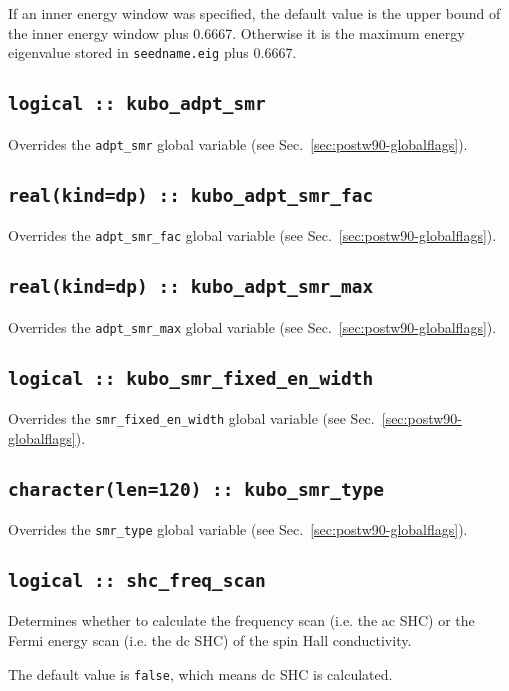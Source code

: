 If an inner energy window was specified, the default value is the
upper bound of the inner energy window plus 0.6667.  Otherwise it is
the maximum energy eigenvalue stored in {\tt seedname.eig} plus
0.6667.

\subsection[optics\_adpt\_smr]{\tt logical :: kubo\_adpt\_smr}
Overrides the \verb#adpt_smr# global variable (see
Sec.~\ref{sec:postw90-globalflags}).

\subsection[optics\_adpt\_smr\_fac]{\tt real(kind=dp) ::
  kubo\_adpt\_smr\_fac}
Overrides the \verb#adpt_smr_fac# global variable (see
Sec.~\ref{sec:postw90-globalflags}).

\subsection[optics\_adpt\_smr\_max]{\tt real(kind=dp) ::
  kubo\_adpt\_smr\_max}
Overrides the \verb#adpt_smr_max# global variable (see
Sec.~\ref{sec:postw90-globalflags}).

\subsection[optics\_smr\_fixed\_en\_width]{\tt logical :: 
kubo\_smr\_fixed\_en\_width}
Overrides the \verb#smr_fixed_en_width# global variable (see
Sec.~\ref{sec:postw90-globalflags}).

\subsection[optics\_smr\_type]{\tt  character(len=120) :: 
kubo\_smr\_type}
Overrides the \verb#smr_type# global variable (see
Sec.~\ref{sec:postw90-globalflags}).

\subsection[shc\_freq\_scan]{\tt logical :: 
shc\_freq\_scan}
Determines whether to calculate the frequency scan (i.e. the ac SHC) or the 
Fermi energy scan (i.e. the dc SHC) of the spin Hall conductivity.

The default value is \verb#false#, which 
means dc SHC is calculated.


